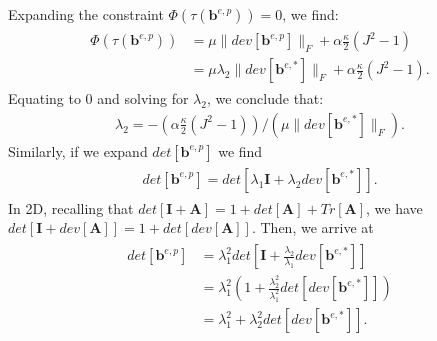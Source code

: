 Expanding the constraint $\Phi\left( \tau\left( \bm{b}^{e,p} \right) \right) = 0$, we find:
\begin{align}
\begin{aligned}
  \Phi\left( \tau \left( \bm{b}^{e,p} \right) \right) &= \mu \| dev[\bm{b}^{e,p}] \|_F + \alpha \frac{\kappa}{2} ( J^2 - 1 ) \\
                                                              &= \mu \lambda_2 \| dev[\bm{b}^{e,*}] \|_F + \alpha \frac{\kappa}{2} ( J^2 - 1 ).
\end{aligned}
\end{align}
Equating to $0$ and solving for $\lambda_2$, we conclude that:
\begin{align}
  \lambda_2 = - \left(\alpha \frac{\kappa}{2} ( J^2 - 1 )\right) / \left( \mu \| dev[\bm{b}^{e,*}] \|_F \right).
\end{align}
Similarly, if we expand $det[\bm{b}^{e,p}]$ we find 
\begin{align}
\begin{aligned}
  det[\bm{b}^{e,p}] = det[ \lambda_1 \bm{I} + \lambda_2 dev[\bm{b}^{e,*}] ].
\end{aligned}
\end{align}
In 2D, recalling that $det[\bm{I} + \bm{A}] = 1 + det[\bm{A}] + Tr[\bm{A}]$, we have
$det[\bm{I} + dev[\bm{A}]] = 1 + det[dev[\bm{A}]]$. Then, we arrive at
\begin{align}
\begin{aligned}
  det[\bm{b}^{e,p}] &= \lambda_1^2 det[ \bm{I} + \frac{\lambda_2}{\lambda_1} dev[\bm{b}^{e,*}] ] \\
                             &= \lambda_1^2 \left( 1 + \frac{\lambda_2^2}{\lambda_1^2} det[ dev[\bm{b}^{e,*}] ] \right) \\
                             &= \lambda_1^2 + \lambda_2^2 det[ dev[\bm{b}^{e,*}] ].
\end{aligned}
\end{align}
